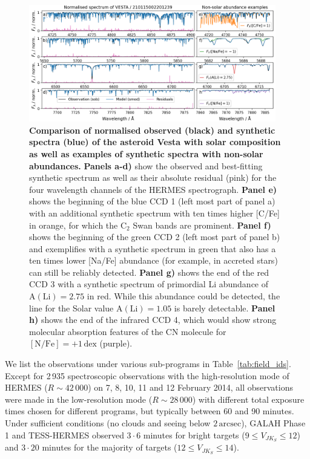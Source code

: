 \documentclass[
  journal=pasa,
  manuscript=research-paper, %
  year=2024,
  volume=37
]{cup-journal}
\begin{document}
\begin{figure}[ht]
 \centering
 \includegraphics[width=0.96\textwidth]{figures/210115002201239_abundance_examples.png}
 \caption{\textbf{Comparison of normalised observed (black) and synthetic spectra (blue) of the asteroid Vesta with solar composition as well as examples of synthetic spectra with non-solar abundances.}
 \textbf{Panels a-d)} show the observed and best-fitting synthetic spectrum as well as their absolute residual (pink) for the four wavelength channels of the HERMES spectrograph.
 \textbf{Panel e)} shows the beginning of the blue CCD 1 (left most part of panel a) with an additional synthetic spectrum with ten times higher [C/Fe] in orange, for which the $\mathrm{C}_2$  Swan bands are prominent.
 \textbf{Panel f)} shows the beginning of the green CCD 2 (left most part of panel b) and exemplifies with a synthetic spectrum in green that also has a ten times lower [Na/Fe] abundance (for example, in accreted stars) can still be reliably detected. 
 \textbf{Panel g)} shows the end of the red CCD 3 with a synthetic spectrum of primordial Li abundance of $\mathrm{A(Li)} = 2.75$ in red. While this abundance could be detected, the line for the Solar value $\mathrm{A(Li)} = 1.05$ is barely detectable.
 \textbf{Panel h)} shows the end of the infrared CCD 4, which would show strong molecular absorption features of the CN molecule for $\mathrm{[N/Fe]} = +1\,\mathrm{dex}$ (purple).
 }
 \label{fig:210115002201239_abundance_examples}
\end{figure}

We list the observations under various sub-programs in Table~\ref{tab:field_ids}. Except for 2\,935 spectroscopic observations with the high-resolution mode of HERMES ($R \sim 42\,000$) on 7, 8, 10, 11 and 12 February 2014, all observations were made in the low-resolution mode ($R \sim 28\,000$) with different total exposure times chosen for different programs, but typically between 60 and 90 minutes. Under sufficient conditions (no clouds and seeing below $2\,\mathrm{arcsec}$), GALAH Phase 1 and TESS-HERMES observed $3 \cdot 6$ minutes for bright targets ($9 \leq V_{JK_S} \leq 12$) and $3 \cdot 20$ minutes for the majority of targets ($12 \leq V_{JK_S} \leq 14$).
\end{document}
